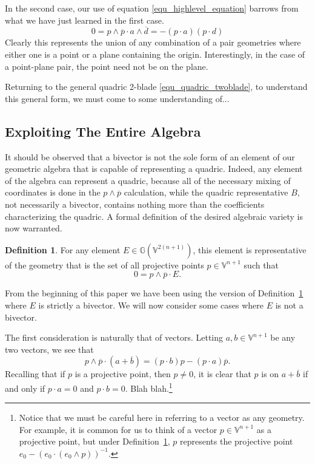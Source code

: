 \documentclass{ecgd-l}
\theoremstyle{definition}
\newtheorem{definition}[theorem]{Definition}
\theoremstyle{remark}
\numberwithin{equation}{section}
\newcommand{\G}{\mathbb{G}}
\newcommand{\V}{\mathbb{V}}
\begin{document}
In the second case, our use of equation \eqref{equ_highlevel_equation} barrows
from what we have just learned in the first case.
\begin{equation}
0 = p\wedge\overline{p}\cdot a\wedge\overline{d} = -(p\cdot a)(p\cdot d)
\end{equation}
Clearly this represents the union of any combination of a pair geometries where either
one is a point or a plane containing the origin.  Interestingly, in the case of a
point-plane pair, the point need not be on the plane.

Returning to the general quadric 2-blade \eqref{equ_quadric_twoblade}, to understand
this general form, we must come to some understanding of...





\subsection{Exploiting The Entire Algebra}

It should be observed that a bivector is not the sole form of an
element of our geometric algebra that is capable of representing
a quadric.  Indeed, any element of the algebra can represent a quadric,
because all of the necessary mixing of coordinates is done in the
$p\wedge\overline{p}$ calculation, while the quadric representative
$B$, not necessarily a bivector, contains nothing more than the coefficients characterizing the quadric.
A formal definition of the desired algebraic variety is now warranted.
\begin{definition}\label{def_quadric_variety}
For any element $E\in\G(\V^{2(n+1)})$, this element is representative of the
geometry that is the set of all projective points $p\in\V^{n+1}$ such that
\begin{equation}
0=p\wedge\overline{p}\cdot E.
\end{equation}
\end{definition}
From the beginning of this paper we have been using the version of
Definition~\ref{def_quadric_variety} where $E$ is strictly a bivector.  We will now consider
some cases where $E$ is not a bivector.

The first consideration is naturally that of vectors.  Letting $a,b\in\V^{n+1}$ be any two
vectors, we see that
\begin{equation}
p\wedge\overline{p}\cdot(a+\overline{b}) = (p\cdot b)p - (p\cdot a)\overline{p}.
\end{equation}
Recalling that if $p$ is a projective point, then $p\neq 0$, it is clear that $p$ is on $a+\overline{b}$
if and only if $p\cdot a=0$ and $p\cdot b=0$.
Blah blah.\footnote{Notice that we must be careful here in referring to a
vector as any geometry.  For example, it is common for us to think of a vector $p\in\V^{n+1}$
as a projective point, but under Definition~\ref{def_quadric_variety}, $p$ represents the projective
point $e_0-(e_0\cdot (e_0\wedge p))^{-1}$.}
\end{document}

